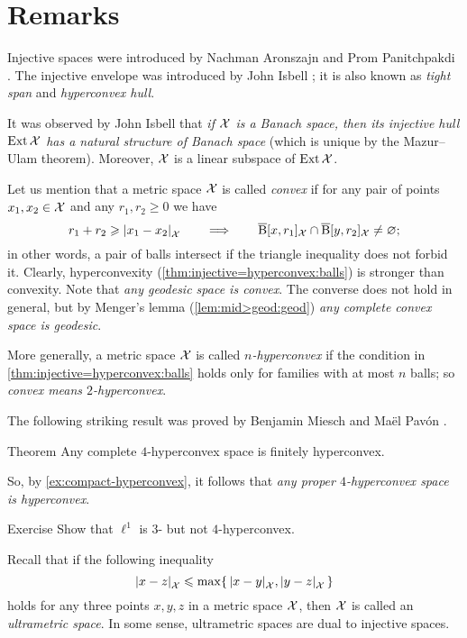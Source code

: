 \section{Remarks}

Injective spaces were introduced by Nachman Aronszajn and Prom Panitchpakdi \cite{aronszajn-panitchpakdi}.
The injective envelope was introduced by John Isbell \cite{isbell}; it is also known as \emph{tight span} and \emph{hyperconvex hull}.

It was observed by John Isbell \cite{isbell2} that \textit{if $\mathcal{X}$ is a Banach space, then its injective hull $\mathop{\rm Ext}\nolimits\mathcal{X}$ has a natural structure of Banach space} (which is unique by the Mazur--Ulam theorem).
Moreover, $\mathcal{X}$ is a linear subspace of $\mathop{\rm Ext}\nolimits\mathcal{X}$.
 
Let us mention that a metric space $\mathcal{X}$ is called \emph{convex} if for any pair of points $x_1,x_2\in \mathcal{X}$ and any $r_1,r_2\ge 0$ we have 
\[r_1+r_2\ge \dist{x_1}{x_2}{\spc{X}}\qquad\Longrightarrow\qquad\cBall[x,r_1]_\spc{X}\cap \cBall[y,r_2]_\spc{X}\ne\emptyset;\]
in other words, a pair of balls intersect if the triangle inequality does not forbid it.
Clearly, hyperconvexity (\ref{thm:injective=hyperconvex:balls}) is stronger than convexity.
Note that \textit{any geodesic space is convex}.
The converse does not hold in general, but by Menger's lemma (\ref{lem:mid>geod:geod}) \textit{any complete convex space is geodesic}.

More generally, a metric space $\mathcal{X}$ is called \emph{$n$-hyperconvex} if the condition in \ref{thm:injective=hyperconvex:balls} holds only for families with at most $n$ balls; so \textit{convex means $2$-hyperconvex}.

The following striking result was proved by Benjamin Miesch and Maël Pavón \cite{miesch-pavon2016}.

\begin{thm}{Theorem}
Any complete $4$-hyperconvex space is finitely hyperconvex.
\end{thm}

So, by \ref{ex:compact-hyperconvex}, it follows that \textit{any proper $4$-hyperconvex space is hyperconvex}.

\begin{thm}{Exercise}\label{ex:3-4-hypreconvex}
Show that $\ell^1$ is $3$- but not $4$-hyperconvex.
\end{thm}
 

Recall that if the following inequality
\[\dist{x}{z}{\spc{X}}
\le
\max\{\,\dist{x}{y}{\spc{X}},\dist{y}{z}{\spc{X}}\,\}\]
holds for any three points $x,y,z$ in a metric space $\mathcal{X}$,
then $\mathcal{X}$ is called an \emph{ultrametric space}.
In some sense, ultrametric spaces are dual to injective spaces.

